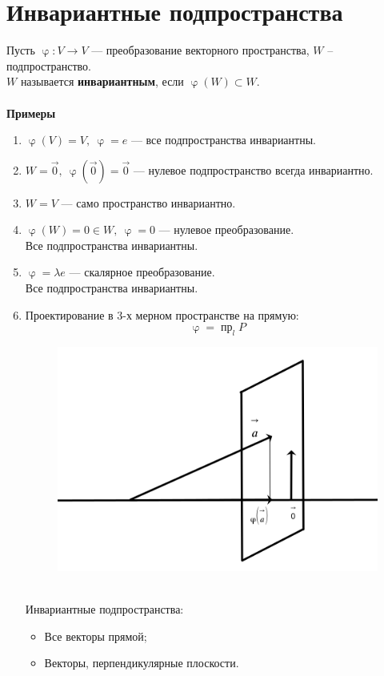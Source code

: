 \documentclass[a4paper, 12pt]{article}
\newcommand{\pr}{\operatorname{\text{пр}}}
\renewcommand{\varphi}{\upvarphi}
\begin{document}
    \section{Инвариантные подпространства}
    Пусть $\varphi: V \rightarrow V$ --- преобразование векторного пространства, $W$ -- подпространство.\\
    $W$ называется \textbf{инвариантным}, если $\varphi(W) \subset W$.\\\\
    \textbf{Примеры}
    \begin{enumerate}
        \item $\varphi(V) = V, \ \varphi = e$ --- все подпространства инвариантны.
        \item $W = \vec0, \ \varphi(\vec0) = \vec0$ --- нулевое подпространство всегда инвариантно.
        \item $W = V$ --- само пространство инвариантно.
        \item $\varphi(W) = 0 \in W, \ \varphi = 0$ --- нулевое преобразование.\\
        Все подпространства инвариантны.
        \item $\varphi = \lambda e$ --- скалярное преобразование.\\
        Все подпространства инвариантны.
        \item Проектирование в 3-х мерном пространстве на прямую:
        $$\varphi = \pr_l P$$
        \begin{figure}[h]
    \begin{center}
    \includegraphics[scale=0.8]{0st25sYXFU (1).png}
    \end{center}
    \end{figure}\\
        Инвариантные подпространства:
        \begin{itemize}
            \item Все векторы прямой;
            \item Векторы, перпендикулярные плоскости.
        \end{itemize}
    \end{enumerate}
\end{document}

